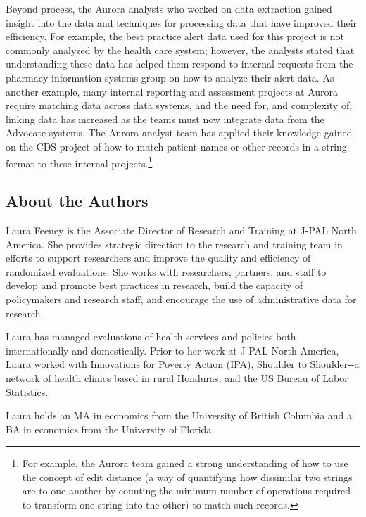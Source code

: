 \documentclass[
]{WileySix}
\begin{document}
Beyond process, the Aurora analysts who worked on data extraction gained insight into the data and techniques for processing data that have improved their efficiency. For example, the best practice alert data used for this project is not commonly analyzed by the health care system; however, the analysts stated that understanding these data has helped them respond to internal requests from the pharmacy information systems group on how to analyze their alert data. As another example, many internal reporting and assessment projects at Aurora require matching data across data systems, and the need for, and complexity of, linking data has increased as the teams must now integrate data from the Advocate systems. The Aurora analyst team has applied their knowledge gained on the CDS project of how to match patient names or other records in a string format to these internal projects.\footnote{For example, the Aurora team gained a strong understanding of how to use the concept of edit distance (a way of quantifying how dissimilar two strings are to one another by counting the minimum number of operations required to transform one string into the other) to match such records.}

\hypertarget{about-the-authors-4}{%
\subsection*{About the Authors}\label{about-the-authors-4}}

Laura Feeney is the Associate Director of Research and Training at J-PAL North America. She provides strategic direction to the research and training team in efforts to support researchers and improve the quality and efficiency of randomized evaluations. She works with researchers, partners, and staff to develop and promote best practices in research, build the capacity of policymakers and research staff, and encourage the use of administrative data for research.

Laura has managed evaluations of health services and policies both internationally and domestically. Prior to her work at J-PAL North America, Laura worked with Innovations for Poverty Action (IPA), Shoulder to Shoulder-\/-a network of health clinics based in rural Honduras, and the US Bureau of Labor Statistics.

Laura holds an MA in economics from the University of British Columbia and a BA in economics from the University of Florida.
\end{document}
